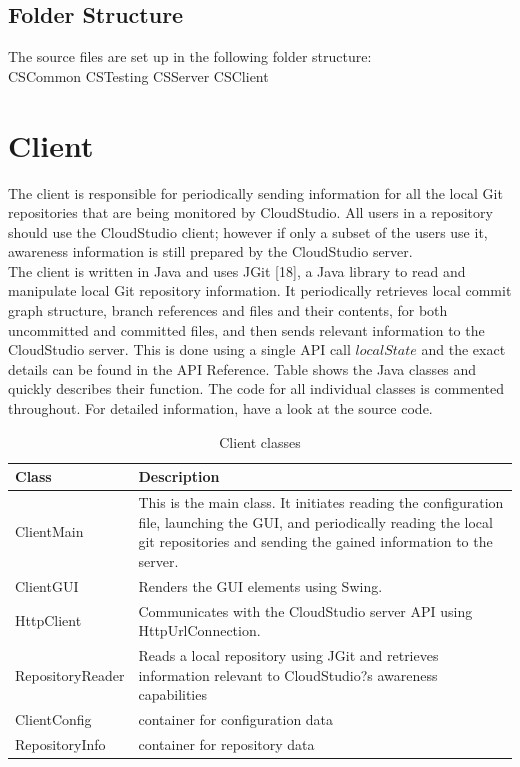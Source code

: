 \subsection{Folder Structure}

The source files are set up in the following folder structure: \\

CSCommon
CSTesting
CSServer
CSClient






\section{Client}

The client is responsible for periodically sending information for all the local Git repositories that are being monitored by CloudStudio. All users in a repository should use the CloudStudio client; however if only a subset of the users use it, awareness information is still prepared by the CloudStudio server. \\

The client is written in Java and uses JGit [18], a Java library to read and manipulate local Git repository information. It periodically retrieves local commit graph structure, branch references and files and their contents, for both uncommitted and committed files, and then sends relevant information to the CloudStudio server. This is done using a single API call $localState$ and the exact details can be found in the API Reference. Table \cite{table:clientclasses} shows the Java classes and quickly describes their function. The code for all individual classes is commented throughout. For detailed information, have a look at the source code. \\




\begin{table}

    \scriptsize
    \begin{tabularx}{\textwidth}{ | l | X | }
    \hline
Class & Description \\ \hline
ClientMain & This is the main class. It initiates reading the configuration file, launching the GUI, and periodically reading the local git repositories and sending the gained information to the server. \\ \hline
ClientGUI & Renders the GUI elements using Swing. \\ \hline
HttpClient & Communicates with the CloudStudio server API using HttpUrlConnection. \\ \hline
RepositoryReader & Reads a local repository using JGit and retrieves information relevant to CloudStudio?s awareness capabilities \\ \hline
ClientConfig & container for configuration data \\ \hline
RepositoryInfo & container for repository data \\ \hline
    \end{tabularx}
    
    \centering
  \caption{Client classes}
  \label{table:clientclasses}
\end{table}


